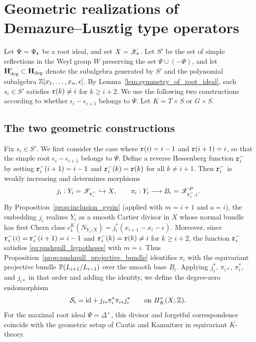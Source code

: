 \section{Geometric realizations of Demazure--Lusztig type operators}
\label{sec:geometric_hecke}

Let $\Psi=\Psi_{\mathtt r}$ be a root ideal, and set $X=\mathscr X_{\mathtt r}$.
Let $S'$ be the set of simple reflections in the Weyl group $W$ preserving
the set $\Psi\cup(-\Psi)$, and let $\mathbf H_{\mathrm{deg}}'\subset\mathbf H_{\mathrm{deg}}$ denote the
subalgebra generated by $S'$ and the polynomial subalgebra $\mathbb Z[x_1,\dots,x_n,\epsilon]$.
By Lemma~\ref{lem:symmetry_of_root_ideal}, each $s_i\in S'$ satisfies
$\mathtt r(k)\neq i$ for $k\geq i+2$. We use the following two constructions
according to whether $\epsilon_i-\epsilon_{i+1}$ belongs to $\Psi$.
Let $K=T\times S$ or $G\times S$.

\subsection{The two geometric constructions}

Fix $s_i\in S'$. We first consider the case where $\mathtt r(i)=i-1$ and $\mathtt r(i+1)=i$, so that the
simple root $\epsilon_i-\epsilon_{i+1}$ belongs to $\Psi$.
Define a reverse Hessenberg function $\mathtt r_i^-$ by setting $\mathtt r_i^-(i+1)=i-1$
and $\mathtt r_i^-(k)=\mathtt r(k)$ for all $k\neq i+1$.
Then $\mathtt r_i^-$ is weakly increasing and determines morphisms
\[
  j_i:Y_i=\mathscr X_{\mathtt r_i^-}\hookrightarrow X,
  \qquad
  \pi_i:Y_i\longrightarrow B_i=\mathscr X_{\mathtt r_i^-,i}^P.
\]
By Proposition~\ref{prop:inclusion_gysin} (applied with $m=i+1$ and $a=i$), the embedding $j_i$
realizes $Y_i$ as a smooth Cartier divisor in $X$ whose normal bundle has first Chern class
$c_1^K(N_{Y_i/X})=j_i^*(x_{i+1}-x_i-\epsilon)$.
Moreover, since $\mathtt r_i^-(i)=\mathtt r_i^-(i+1)=i-1$ and $\mathtt r_i^-(k)=\mathtt r(k)\neq i$ for $k\geq i+2$,
the function $\mathtt r_i^-$ satisfies \eqref{eq:pushpull_hypotheses} with $m=i$.
Thus Proposition~\ref{prop:pushpull_projective_bundle} identifies $\pi_i$ with the equivariant
projective bundle $\mathbb P(L_{i+1}/L_{i-1})$ over the smooth base $B_i$.
Applying $j_i^*$, $\pi_{i*}$, $\pi_i^*$, and $j_{i*}$ in that order and adding the identity,
we define the degree-zero endomorphism
\begin{equation}\label{eq:hecke_case_A}
  \mathcal S_i=\mathrm{id}+j_{i*}\pi_i^*\pi_{i*}j_i^*
  \qquad\text{on }H^*_K(X;\mathbb Z).
\end{equation}
For the maximal root ideal $\Psi=\Delta^+$, this divisor and forgetful correspondence coincide
with the geometric setup of Cautis and Kamnitzer \cite[Lemma~9.3]{cautis2018quantum} in equivariant $K$-theory.

